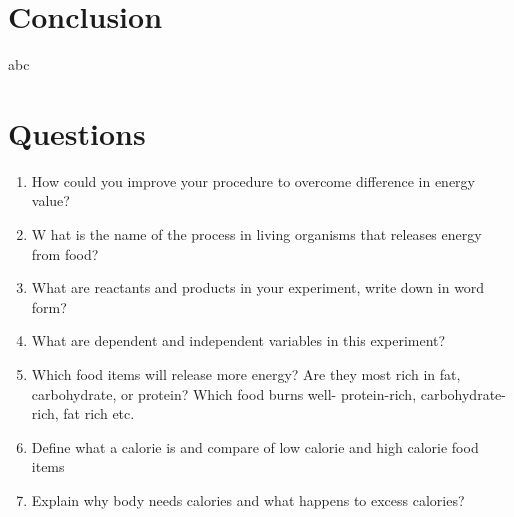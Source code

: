 \documentclass[a4paper, 12pt, english]{article}
\begin{document}
\section{Conclusion}
abc

\section{Questions}
\begin{enumerate}
	\item How could you improve your procedure to overcome difference in energy value?

	\item W hat is the name of the process in living organisms that releases energy from
	      food?
	\item What are reactants and products in your experiment, write down in word form?
	\item What are dependent and independent variables in this experiment?
	\item Which food items will release more energy? Are they most rich in fat,
	      carbohydrate, or protein? Which food burns well- protein-rich,
	      carbohydrate-rich, fat rich etc.
	\item Define what a calorie is and compare of low calorie and high calorie food items
	\item Explain why body needs calories and what happens to excess calories?
\end{enumerate}
\end{document}
